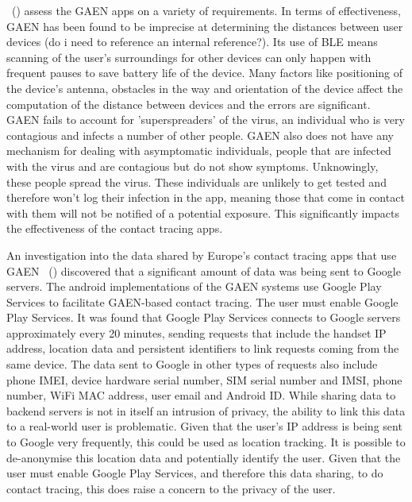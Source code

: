 ~(\cite{9931613})  assess the GAEN apps on a variety of requirements. In terms of effectiveness, GAEN has been found to be imprecise at determining the distances between user devices (do i need to reference an internal reference?). Its use of BLE means scanning of the user's surroundings for other devices can only happen with frequent pauses to save battery life of the device. Many factors like positioning of the device's antenna, obstacles in the way and orientation of the device affect the computation of the distance between devices and the errors are significant. GAEN fails to account for 'superspreaders' of the virus, an individual who is very contagious and infects a number of other people. GAEN also does not have any mechanism for dealing with asymptomatic individuals, people that are infected with the virus and are contagious but do not show symptoms. Unknowingly, these people spread the virus. These individuals are unlikely to get tested and therefore won't log their infection in the app, meaning those that come in contact with them will not be notified of a potential exposure. This significantly impacts the effectiveness of the contact tracing apps. \newline

An investigation into the data shared by Europe's contact tracing apps that use GAEN ~(\cite{9488728}) discovered that a significant amount of data was being sent to Google servers. The android implementations of the GAEN systems use Google Play Services to facilitate GAEN-based contact tracing. The user must enable Google Play Services. It was found that Google Play Services connects to Google servers approximately every 20 minutes, sending requests that include the handset IP address, location data and persistent identifiers to link requests coming from the same device. The data sent to Google in other types of requests also include phone IMEI, device hardware serial number, SIM serial number and IMSI, phone number, WiFi MAC address, user email and Android ID. While sharing data to backend servers is not in itself an intrusion of privacy, the ability to link this data to a real-world user is problematic. Given that the user's IP address is being sent to Google very frequently, this could be used as location tracking. It is possible to de-anonymise this location data and potentially identify the user. Given that the user must enable Google Play Services, and therefore this data sharing, to do contact tracing, this does raise a concern to the privacy of the user. \newline

